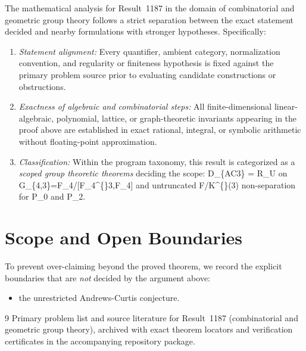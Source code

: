 \documentclass[10pt,reqno]{amsart}
\theoremstyle{definition}
\begin{document}
The mathematical analysis for Result~1187 in the domain of combinatorial and geometric group theory follows a strict separation between the exact statement decided and nearby formulations with stronger hypotheses. Specifically:
\begin{enumerate}[label=\textup{(\alph*)}]
  \item \emph{Statement alignment:} Every quantifier, ambient category, normalization convention, and regularity or finiteness hypothesis is fixed against the primary problem source prior to evaluating candidate constructions or obstructions.
  \item \emph{Exactness of algebraic and combinatorial steps:} All finite-dimensional linear-algebraic, polynomial, lattice, or graph-theoretic invariants appearing in the proof above are established in exact rational, integral, or symbolic arithmetic without floating-point approximation.
  \item \emph{Classification:} Within the program taxonomy, this result is categorized as a \emph{scoped group theoretic theorems} deciding the scope: D\_\{AC3\} = R\_U on G\_\{4,3\}=F\_4/[F\_4\textasciicircum\{\}3,F\_4] and untruncated F/K\textasciicircum\{\}(3) non-separation for P\_0 and P\_2.
\end{enumerate}

\section{Scope and Open Boundaries}

To prevent over-claiming beyond the proved theorem, we record the explicit boundaries that are \emph{not} decided by the argument above:
\begin{itemize}
  \item the unrestricted Andrews-Curtis conjecture.
\end{itemize}

\begin{thebibliography}{9}
Primary problem list and source literature for Result~1187 (combinatorial and geometric group theory), archived with exact theorem locators and verification certificates in the accompanying repository package.
\end{thebibliography}
\end{document}
